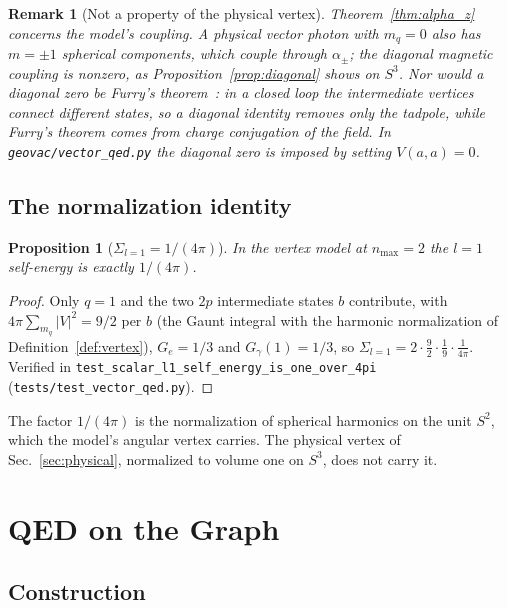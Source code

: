\documentclass[11pt]{article}
\newtheorem{proposition}{Proposition}
\newtheorem{remark}{Remark}
\begin{document}
\begin{remark}[Not a property of the physical vertex]
\label{rem:not_C}
Theorem~\ref{thm:alpha_z} concerns the model's coupling.  A physical
vector photon with $m_q = 0$ also has $m = \pm 1$ spherical components,
which couple through $\alpha_\pm$; the diagonal magnetic coupling is
nonzero, as Proposition~\ref{prop:diagonal} shows on $S^3$.  Nor would a
diagonal zero be Furry's theorem~\cite{furry1937}: in a closed loop the
intermediate vertices connect different states, so a diagonal identity
removes only the tadpole, while Furry's theorem comes from charge
conjugation of the field.  In \texttt{geovac/vector\_qed.py} the diagonal
zero is imposed by setting $V(a, a) = 0$.
\end{remark}

\subsection{The normalization identity}

\begin{proposition}[$\Sigma_{l=1} = 1/(4\pi)$]
\label{prop:1_over_4pi}
In the vertex model at $n_{\max} = 2$ the $l = 1$ self-energy is exactly
$1/(4\pi)$.
\end{proposition}

\begin{proof}
Only $q = 1$ and the two $2p$ intermediate states $b$ contribute, with
$4\pi\sum_{m_q}|V|^2 = 9/2$ per $b$ (the Gaunt integral with the
harmonic normalization of Definition~\ref{def:vertex}), $G_e = 1/3$ and
$G_\gamma(1) = 1/3$, so
$\Sigma_{l=1} = 2 \cdot \tfrac{9}{2} \cdot \tfrac19 \cdot \tfrac{1}{4\pi}$.
Verified in \texttt{test\_scalar\_l1\_self\_energy\_is\_one\_over\_4pi}
(\texttt{tests/test\_vector\_qed.py}).
\end{proof}

The factor $1/(4\pi)$ is the normalization of spherical harmonics on the
unit $S^2$, which the model's angular vertex carries.  The physical
vertex of Sec.~\ref{sec:physical}, normalized to volume one on $S^3$,
does not carry it.

\section{QED on the Graph}
\label{sec:graph}

\subsection{Construction}
\end{document}
